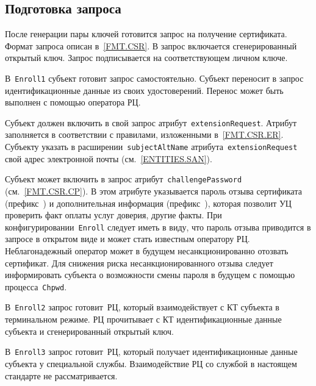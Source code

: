 
\subsection{Подготовка запроса}\label{PROCESSES.Enroll.CSR}

После генерации пары ключей готовится запрос на получение сертификата. 
Формат запроса описан в~\ref{FMT.CSR}. В запрос включается сгенерированный 
открытый ключ. Запрос подписывается на соответствующем личном ключе.

В~\texttt{Enroll1} субъект готовит запрос самостоятельно.
Субъект переносит в запрос идентификационные данные из своих 
удостоверений. Перенос может быть выполнен с помощью оператора РЦ.

Субъект должен включить в свой запрос атрибут~\texttt{extensionRequest}.
Атрибут заполняется в соответствии с правилами, изложенными 
в~\ref{FMT.CSR.ER}. Субъекту  указать в 
расширении~\texttt{subjectAltName} атрибута~\texttt{extensionRequest} 
свой адрес электронной почты (см.~\ref{ENTITIES.SAN}).

Субъект может включить в запрос атрибут~\texttt{challengePassword} 
(см.~\ref{FMT.CSR.CP}). В этом атрибуте указывается пароль отзыва 
сертификата (префикс~) и дополнительная информация 
(префикс~), которая позволит УЦ проверить факт оплаты услуг 
доверия, другие факты. 
%
При конфигурировании~\texttt{Enroll} следует иметь в виду, что пароль 
отзыва приводится в запросе в открытом виде и может стать известным 
оператору РЦ. Неблагонадежный оператор может в будущем несанкционированно 
отозвать сертификат. Для снижения риска несанкционированного отзыва 
следует информировать субъекта о возможности смены пароля в будущем с помощью 
процесса~\texttt{Chpwd}.

В~\texttt{Enroll2} запрос готовит~РЦ, который взаимодействует с КТ 
субъекта в терминальном режиме. РЦ прочитывает с КТ идентификационные 
данные субъекта и сгенерированный открытый ключ.

В~\texttt{Enroll3} запрос готовит~РЦ, который получает идентификационные 
данные субъекта у специальной службы. Взаимодействие РЦ со службой в 
настоящем стандарте не рассматривается.


